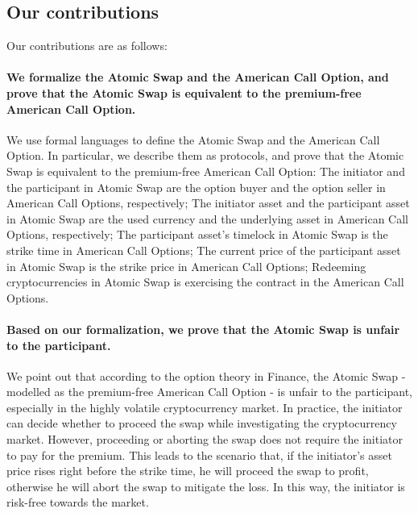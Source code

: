 \subsection{Our contributions}

Our contributions are as follows:

\paragraph{We formalize the Atomic Swap and the American Call Option, and prove that the Atomic Swap is equivalent to the premium-free American Call Option.}
We use formal languages to define the Atomic Swap and the American Call Option.
In particular, we describe them as protocols, and prove that the Atomic Swap is equivalent to the premium-free American Call Option:
The initiator and the participant in Atomic Swap are the option buyer and the option seller in American Call Options, respectively;
The initiator asset and the participant asset in Atomic Swap are the used currency and the underlying asset in American Call Options, respectively;
The participant asset's timelock in Atomic Swap is the strike time in American Call Options;
The current price of the participant asset in Atomic Swap is the strike price in American Call Options;
Redeeming cryptocurrencies in Atomic Swap is exercising the contract in the American Call Options.

\paragraph{Based on our formalization, we prove that the Atomic Swap is unfair to the participant.}
We point out that according to the option theory in Finance, the Atomic Swap - modelled as the premium-free American Call Option - is unfair to the participant, especially in the highly volatile cryptocurrency market.
In practice, the initiator can decide whether to proceed the swap while investigating the cryptocurrency market.
However, proceeding or aborting the swap does not require the initiator to pay for the premium.
This leads to the scenario that, if the initiator's asset price rises right before the strike time, he will proceed the swap to profit, otherwise he will abort the swap to mitigate the loss.
In this way, the initiator is risk-free towards the market.

